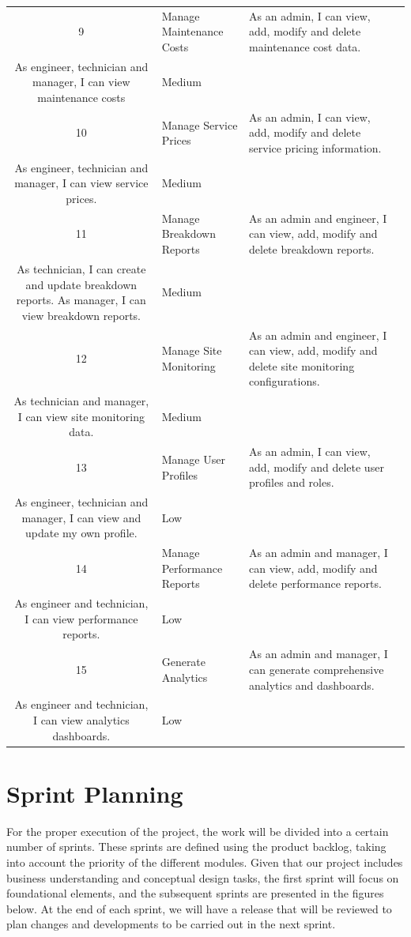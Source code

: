 \begin{longtable}{|c|p{4cm}|p{7cm}|c|}
9 & Manage Maintenance Costs & As an admin, I can view, add, modify and delete maintenance cost data.\vspace{0.25cm} \\ As engineer, technician and manager, I can view maintenance costs & Medium \\ \hline
10 & Manage Service Prices & As an admin, I can view, add, modify and delete service pricing information.\vspace{0.25cm} \\ As engineer, technician and manager, I can view service prices. & Medium \\ \hline
11 & Manage Breakdown Reports & As an admin and engineer, I can view, add, modify and delete breakdown reports.\vspace{0.25cm} \\ As technician, I can create and update breakdown reports. As manager, I can view breakdown reports. & Medium \\ \hline
12 & Manage Site Monitoring & As an admin and engineer, I can view, add, modify and delete site monitoring configurations.\vspace{0.25cm} \\ As technician and manager, I can view site monitoring data. & Medium \\ \hline
13 & Manage User Profiles & As an admin, I can view, add, modify and delete user profiles and roles.\vspace{0.25cm} \\ As engineer, technician and manager, I can view and update my own profile. & Low \\ \hline
14 & Manage Performance Reports & As an admin and manager, I can view, add, modify and delete performance reports.\vspace{0.25cm} \\ As engineer and technician, I can view performance reports. & Low \\ \hline
15 & Generate Analytics & As an admin and manager, I can generate comprehensive analytics and dashboards.\vspace{0.25cm} \\ As engineer and technician, I can view analytics dashboards. & Low \\ \hline
\end{longtable}

\section{Sprint Planning}
\vspace{1cm}
For the proper execution of the project, the work will be divided into a certain number of sprints. These sprints are defined using the product backlog, taking into account the priority of the different modules. Given that our project includes business understanding and conceptual design tasks, the first sprint will focus on foundational elements, and the subsequent sprints are presented in the figures below. At the end of each sprint, we will have a release that will be reviewed to plan changes and developments to be carried out in the next sprint.

